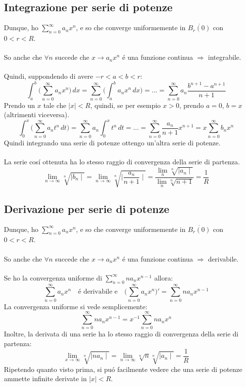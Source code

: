 \documentclass[a4paper,10pt,italian]{article}
\begin{document}
\subsection{Integrazione per serie di potenze}
Dunque, ho $\sum_{n=0}^{\infty}a_nx^n$, e so che converge uniformemente in $\overline{B_r(0)}$ con $0<r<R$. \\ \\
So anche che $\forall n$ succede che $x\rightarrow a_nx^n$ \'e una funzione continua $\Rightarrow$ integrabile. \\ \\
Quindi, suppondendo di avere $-r<a<b<r$:
$$\int_{a}^{b} \Bigr( \sum_{n=0}^{\infty} a_nx^n \Bigr)\,dx = \sum_{n=0}^{\infty} \Bigr( \int_{a}^{b} a_nx^n \, dx \Bigr) 
= ... = \sum_{n=0}^{\infty} a_n\frac{b^{n+1}-a^{n+1}}{n+1}$$
Prendo un $x$ tale che $\mid x \mid < R$, quindi, se per esempio $x>0$, prendo $a=0$, $b=x$ (altrimenti viceversa).
$$ \int_{0}^{x} \Bigr( \sum_{n=0}^{\infty} a_nt^n \, dt \Bigr) 
= \sum_{n=0}^{\infty}a_n\int_{0}^{x}t^n\,dt
= ... = \sum_{n=0}^{\infty} \frac{a_n}{n+1}x^{n+1}
= x\sum_{n=0}^{\infty}b_nx^n $$
Quindi integrando una serie di potenze ottengo un'altra serie di potenze. \\ \\
La serie cos\'i ottenuta ha lo stesso raggio di convergenza della serie di partenza.
$$ \lim_{n\rightarrow \infty} \sqrt[n]{\mid b_n \mid} = \lim_{n\rightarrow \infty} \sqrt[n]{\mid \frac{a_n}{n+1} \mid} 
= \frac{\lim_n \sqrt[n]{\mid a_n \mid}}{\lim_n \sqrt[n]{n+1}} = \frac{1}{R} $$

\subsection{Derivazione per serie di potenze}
Dunque, ho $\sum_{n=0}^{\infty}a_nx^n$, e so che converge uniformemente in $\overline{B_r(0)}$ con $0<r<R$. \\ \\
So anche che $\forall n$ succede che $x\rightarrow a_nx^n$ \'e una funzione continua $\Rightarrow$ derivabile. \\ \\
Se ho la convergenza uniforme di $\sum_{n=0}^{\infty}na_nx^{n-1}$ allora:
$$ \sum_{n=0}^{\infty} a_nx^n \quad \mbox{\'e derivabile e} \quad \Bigr( \sum_{n=0}^{\infty} a_nx^n \Bigr)' = \sum_{n=0}^{\infty} na_nx^{n-1} $$
La convergenza uniforme si vede semplicemente:
$$ \sum_{n=0}^{\infty} na_nx^{n-1} = x^{-1}\sum_{n=0}^{\infty} na_nx^n $$
Inoltre, la derivata di una serie ha lo stesso raggio di convergenza della serie di partenza:
$$ \lim_{x \rightarrow \infty} \sqrt[n]{\mid na_n \mid} = \lim_{n\rightarrow\infty} \sqrt[n]{n}\sqrt[n]{\mid a_n \mid} = \frac{1}{R}$$
Ripetendo quanto visto prima, si pu\'o facilmente vedere che una serie di potenze ammette infinite derivate in $\mid x \mid < R$.
\end{document}
